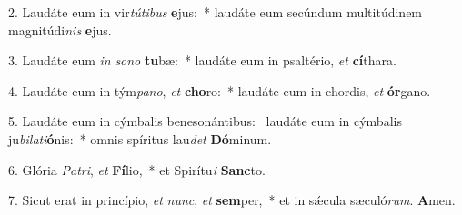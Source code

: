 2. Laudáte eum in vir\textit{tú}\textit{ti}\textit{bus} \textbf{e}jus:~*  laudáte eum secúndum multitúdinem magnitúdi\textit{nis} \textbf{e}jus.\

3. Laudáte eum \textit{in} \textit{so}\textit{no} \textbf{tu}bæ:~*  laudáte eum in psaltério, \textit{et} \textbf{cí}thara.\

4. Laudáte eum in tým\textit{pa}\textit{no}, \textit{et} \textbf{cho}ro:~*  laudáte eum in chordis, \textit{et} \textbf{ór}gano.\

5. Laudáte eum in cýmbalis benesonántibus: \dag\  laudáte eum in cýmbalis ju\textit{bi}\textit{la}\textit{ti}\textbf{ó}nis:~*  omnis spíritus lau\textit{det} \textbf{Dó}minum.\

6. Glória \textit{Pa}\textit{tri}, \textit{et} \textbf{Fí}lio,~*  et Spirítu\textit{i} \textbf{Sanc}to.\

7. Sicut erat in princípio, \textit{et} \textit{nunc}, \textit{et} \textbf{sem}per,~*  et in sǽcula sæculó\textit{rum}. \textbf{A}men.\

